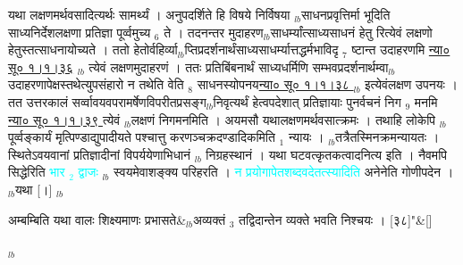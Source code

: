 \documentclass[article,12pt,a4paper]{memoir}%
\newcommand{\quotelemma}[1]{\textcolor{cyan}{#1}}
\newcounter{parCount}
\begin{document}
	  
	  \pstart \leavevmode%
	यथा लक्षणमर्थवसादित्यर्थः सामर्थ्यं । अनुपदर्शिते हि विषये निर्विषया {\tiny $_{lb}$}साधनप्रवृत्तिर्मा भूदिति साध्यनिर्देशलक्षणा प्रतिज्ञा पूर्व्वमुच्य {\tiny $_{6}$} ते । तदनन्तर मुदाहरण{\tiny $_{lb}$}साधर्म्यांत्साध्यसाधनं हेतु रित्येवं लक्षणो हेतुस्तत्साधनायोच्यते । ततो हेतोर्वहिर्व्या{\tiny $_{lb}$}प्तिप्रदर्शनार्थंसाध्यसाधर्म्यात्तद्धर्मभाविदृ {\tiny $_{7}$} ष्टान्त उदाहरणमि \href{http://sarit.indology.info/?cref=ns\%C5\%AB.1.1.36}{न्या० सू० १।१।३६} {\tiny $_{lb}$} त्येवं लक्षणमुदाहरणं । ततः प्रतिबिंबनार्थं साध्यधर्मिणि सम्भवप्रदर्शनार्थम्वा{\tiny $_{lb}$}उदाहरणापेक्षस्तथेत्युपसंहारो न तथेति वेति {\tiny $_{8}$} साधनस्योपनय\href{http://sarit.indology.info/?cref=ns\%C5\%AB.1.1.38}{न्या० सू० १।१।३८ } {\tiny $_{lb}$} इत्येवंलक्षण उपनयः । तत उत्तरकालं सर्व्वावयवपरामर्षेणविपरीतप्रसङ्ग{\tiny $_{lb}$}निवृत्यर्थं हेत्वपदेशात् प्रतिज्ञायाः पुनर्वचनं निग {\tiny $_{9}$} \leavevmode{} मनमि \href{http://sarit.indology.info/?cref=ns\%C5\%AB.1.1.39}{न्या० सू० १।१।३९ } त्येवं {\tiny $_{lb}$}लक्षणं निगमनमिति । अयमसौ यथालक्षणमर्थवसात्क्रमः । तथाहि लोकेपि {\tiny $_{lb}$}पूर्व्वङ्कार्यं मृत्पिण्डाद्युपादीयते पश्चात्तु करणञ्चक्रदण्डादिकमिति {\tiny $_{1}$} न्यायः । {\tiny $_{lb}$}तत्रैतस्मिनक्रमन्यायतः । स्थितेऽवयवानां प्रतिज्ञादीनां विपर्ययेणाभिधानं {\tiny $_{lb}$} \leavevmode{} निग्रहस्थानं । यथा घटवत्कृतकत्वादनित्य इति । नैवमपि सिद्धेरिति \quotelemma{भार {\tiny $_{2}$} द्वाजः} {\tiny $_{lb}$} स्वयमेवाशङ्क्य परिहरति । \quotelemma{न प्रयोगापेतशब्दवदेतत्स्यादिति} अनेनेति गोणीपदेन । {\tiny $_{lb}$}यथा [।]
	{}
	\pend%
      {\tiny $_{lb}$}
	  \bigskip
	  \begingroup
	
	    
	    \stanza[\smallbreak]
	  अम्बम्बिति यथा वालः शिक्ष्यमाणः प्रभासते&{\tiny $_{lb}$}अव्यक्तं {\tiny $_{3}$} तद्विदान्तेन व्यक्ते भवति निश्चयः । [३८]{\normalfontlatin\large\qquad{}"}\&[\smallbreak]
	  
	  
	  
	  \endgroup
	{\tiny $_{lb}$}
\end{document}

